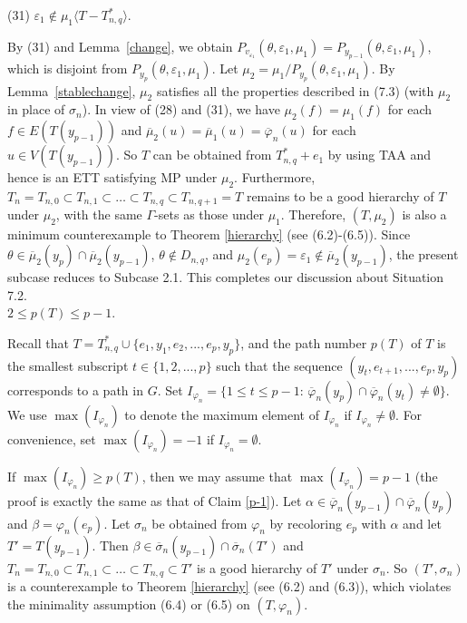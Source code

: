 \documentclass[11pt]{article}
\begin{document}
(31) $\varepsilon_1 \notin \mu_1 \langle T - T_{n,q}^* \rangle$.

By (31) and Lemma~\ref{change}, we obtain $P_{v_{\varepsilon_1}} (\theta, \varepsilon_1, \mu_1) = P_{y_{p-1}}
(\theta, \varepsilon_1, \mu_1)$, which is disjoint from $P_{y_p}(\theta, \varepsilon_1, \mu_1)$. 
Let $\mu_2=\mu_1/P_{y_p}(\theta, \varepsilon_1, \mu_1)$. By Lemma~\ref{stablechange},  $\mu_2$ satisfies 
all the properties described in (7.3) (with $\mu_2$ in place of $\sigma_n$). In view of (28) and (31),
we have $\mu_2(f)=\mu_1(f)$ for each $f\in E(T(y_{p-1}))$ and
$\overline{\mu}_2(u)=\overline{\mu}_1(u)=\overline{\varphi}_n(u)$ for each
$u\in V(T(y_{p-1}))$. So $T$ can be obtained from $T_{n,q}^*+e_1$ by using TAA and hence is an ETT satisfying MP under 
$\mu_2$. Furthermore, $T_n=T_{n,0} \subset T_{n,1} \subset \ldots \subset T_{n,q} \subset T_{n,q+1}=T$ remains to be a good hierarchy of $T$ under $\mu_2$, with the same $\Gamma$-sets as those under $\mu_1$. Therefore, $(T, \mu_2)$ is also a minimum counterexample to Theorem \ref{hierarchy} (see (6.2)-(6.5)). Since $\theta \in \overline{\mu}_2(y_p) \cap \overline{\mu}_2(y_{p-1})$,
$\theta \notin D_{n,q}$, and $\mu_2(e_p)= \varepsilon_1 \notin \overline{\mu}_2(y_{p-1})$, the present subcase reduces to 
Subcase 2.1. This completes our discussion about Situation 7.2.\\


 $2\le p(T)\le p-1$. 

\vskip 2mm
Recall that $T=T_{n,q}^* \cup\{e_1,y_1,e_2,...,e_p,y_p\}$, and the path number $p(T)$ of $T$ is the smallest subscript 
$t \in \{1,2,...,p\}$ such that the sequence $(y_t,e_{t+1},...,e_p,y_p)$ corresponds to a path in $G$. Set $I_{\varphi_n}
=\{1\le t \le p-1: \, \overline{\varphi}_n(y_p)\cap\overline{\varphi}_n(y_t)\ne \emptyset \}$. We use $\max(I_{\varphi_n})$
to denote the maximum element of $I_{\varphi_n}$ if $I_{\varphi_n} \ne \emptyset$. For convenience, set 
$\max(I_{\varphi_n})=-1$ if $I_{\varphi_n}=\emptyset$. 

If $\max(I_{\varphi_n}) \ge p(T)$, then we may assume that $\max(I_{\varphi_n})=p-1$ (the proof is exactly the same as
that of Claim \ref{p-1}). Let $\alpha \in \overline{\varphi}_n(y_{p-1})\cap\overline{\varphi}_n(y_p)$ and 
$\beta=\varphi_n(e_{p})$. Let $\sigma_n$ be obtained from $\varphi_n$ by recoloring $e_p$ with $\alpha$ and let 
$T'=T(y_{p-1})$. Then $\beta \in \overline{\sigma}_n(y_{p-1})\cap\overline{\sigma}_n(T')$ and 
$T_n=T_{n,0} \subset T_{n,1} \subset \ldots \subset T_{n,q}\subset T'$ is a good hierarchy of $T'$ under $\sigma_n$. 
So $(T', \sigma_n)$ is a counterexample to Theorem \ref{hierarchy} (see (6.2) and (6.3)), which violates the minimality 
assumption (6.4) or (6.5) on $(T, \varphi_n)$. 
\end{document}
